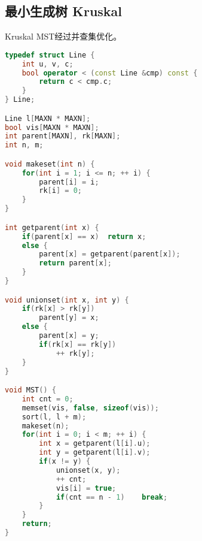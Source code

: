 \subsection{最小生成树 Kruskal}
Kruskal MST经过并查集优化。
    \begin{lstlisting}[language=c++]
typedef struct Line {
    int u, v, c;
    bool operator < (const Line &cmp) const {
        return c < cmp.c;
    }
} Line;

Line l[MAXN * MAXN];
bool vis[MAXN * MAXN];
int parent[MAXN], rk[MAXN];
int n, m;

void makeset(int n) {
    for(int i = 1; i <= n; ++ i) {
        parent[i] = i;
        rk[i] = 0;
    }
}

int getparent(int x) {
    if(parent[x] == x)  return x;
    else {
        parent[x] = getparent(parent[x]);
        return parent[x];
    }
}

void unionset(int x, int y) {
    if(rk[x] > rk[y])
        parent[y] = x;
    else {
        parent[x] = y;
        if(rk[x] == rk[y])
            ++ rk[y];
    }
}

void MST() {
    int cnt = 0;
    memset(vis, false, sizeof(vis));
    sort(l, l + m);
    makeset(n);
    for(int i = 0; i < m; ++ i) {
        int x = getparent(l[i].u);
        int y = getparent(l[i].v);
        if(x != y) {
            unionset(x, y);
            ++ cnt;
            vis[i] = true;
            if(cnt == n - 1)    break;
        }
    }
    return;
}
    \end{lstlisting}
